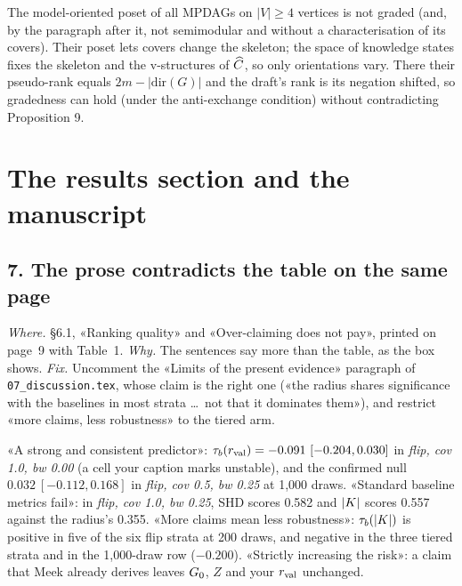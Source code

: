 %
{The model-oriented poset of all MPDAGs on $|V| \ge 4$ vertices is not graded (and, by the paragraph
after it, not semimodular and without a characterisation of its covers). Their poset lets covers change
the skeleton; the space of knowledge states fixes the skeleton and the v-structures of $\widehat{C}$, so only
orientations vary. There their pseudo-rank equals $2m - |\mathrm{dir}(G)|$ and the draft's rank is its
negation shifted, so gradedness can hold (under the anti-exchange condition) without contradicting
Proposition 9.}

\begin{antes}
\end{antes}

\section{The results section and the manuscript}

\subsection*{7. The prose contradicts the table on the same page}

\emph{Where.} \S6.1, «Ranking quality» and «Over-claiming does not pay», printed on page~9 with Table~1.
\emph{Why.} The sentences say more than the table, as the box shows. \emph{Fix.} Uncomment the
«Limits of the present evidence» paragraph of \texttt{07\_discussion.tex}, whose claim is the right one
(«the radius shares significance with the baselines in most strata \dots\ not that it dominates them»),
and restrict «more claims, less robustness» to the tiered arm.

\begin{armadilha}
«A strong and consistent predictor»: $\tau_b(r_{\mathrm{val}}) = -0.091\ [-0.204, 0.030]$ in \emph{flip, cov 1.0, bw
0.00} (a cell your caption marks unstable), and the confirmed null $0.032\ [-0.112, 0.168]$ in \emph{flip,
cov 0.5, bw 0.25} at 1,000 draws. «Standard baseline metrics fail»: in
\emph{flip, cov 1.0, bw 0.25}, SHD scores 0.582 and $|K|$ scores 0.557 against the radius's 0.355.
«More claims mean less robustness»: $\tau_b(|K|)$ is positive in five of the six flip strata at 200
draws, and negative in the three tiered strata and in the 1,000-draw row ($-0.200$). «Strictly increasing the risk»: a claim that Meek already
derives leaves $G_0$, $Z$ and your $r_{\mathrm{val}}$ unchanged.
\end{armadilha}

